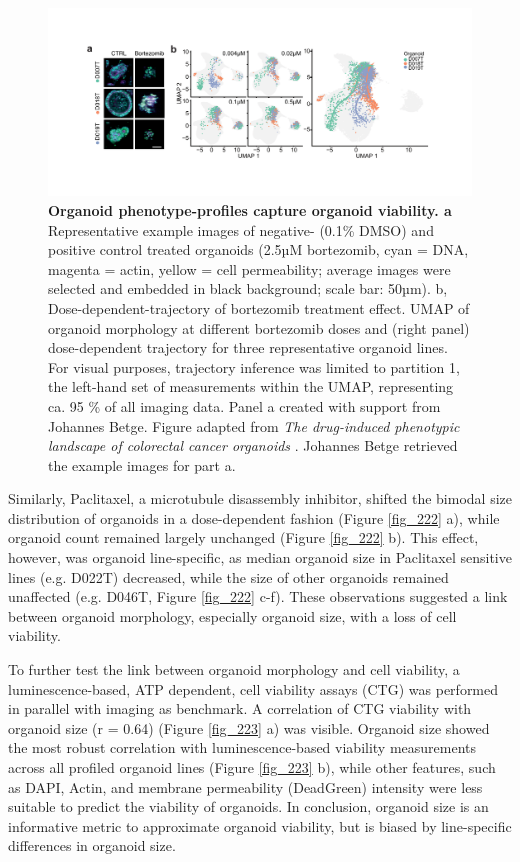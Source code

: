\begin{flushleft}
\begin{figure}[h]
\centering
\includegraphics[width=\textwidth,
                height=\textheight,
                keepaspectratio]{figures/promise/pdf/fig_2_1.pdf}
\caption[Organoid phenotype-profiles capture organoid viability]{\textbf{Organoid phenotype-profiles capture organoid viability. a} Representative example images of negative- (0.1\% DMSO) and positive control treated organoids (2.5µM bortezomib, cyan = DNA, magenta = actin, yellow = cell permeability; average images were selected and embedded in black background; scale bar: 50µm). b, Dose-dependent-trajectory of bortezomib treatment effect. UMAP of organoid morphology at different bortezomib doses and (right panel) dose-dependent trajectory for three representative organoid lines. For visual purposes, trajectory inference was limited to partition 1, the left-hand set of measurements within the UMAP, representing ca. 95 \% of all imaging data. Panel a created with support from Johannes Betge. Figure adapted from \textit{The drug-induced phenotypic landscape of colorectal cancer organoids} \parencite{betgeDruginducedPhenotypicLandscape2022}. Johannes Betge retrieved the example images for part a.}
\label{fig_221}
\end{figure}
\bigbreak

Similarly, Paclitaxel, a microtubule disassembly inhibitor, shifted the bimodal size distribution of organoids in a dose-dependent fashion (Figure \ref{fig_222} a), while organoid count remained largely unchanged (Figure \ref{fig_222} b). This effect, however, was organoid line-specific, as median organoid size in Paclitaxel sensitive lines (e.g. D022T) decreased, while the size of other organoids remained unaffected (e.g. D046T, Figure \ref{fig_222} c-f). These observations suggested a link between organoid morphology, especially organoid size, with a loss of cell viability. 

\bigbreak
To further test the link between organoid morphology and cell viability, a luminescence-based, ATP dependent, cell viability assays (CTG) was performed in parallel with imaging as benchmark. A correlation of CTG viability with organoid size (r = 0.64) (Figure \ref{fig_223} a) was visible. Organoid size showed the most robust correlation with luminescence-based viability measurements across all profiled organoid lines (Figure \ref{fig_223} b), while other features, such as DAPI, Actin, and membrane permeability (DeadGreen) intensity were less suitable to predict the viability of organoids. In conclusion, organoid size is an informative metric to approximate organoid viability, but is biased by line-specific differences in organoid size.



\end{flushleft}
